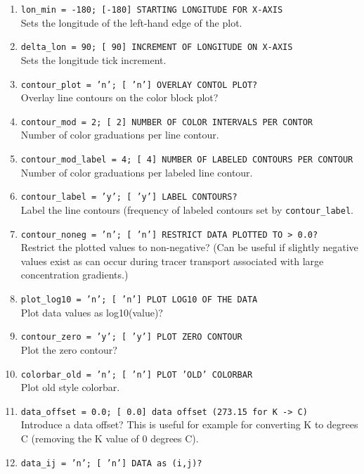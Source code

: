 \documentclass[11pt,fleqn]{book} %
\begin{document}
\vspace{2pt}
{\small \begin{enumerate}
\item \texttt{lon\_min = -180;         [-180]  STARTING LONGITUDE FOR X-AXIS}
\\ Sets the longitude of the left-hand edge of the plot.
\item \texttt{delta\_lon = 90;         [  90]  INCREMENT OF LONGITUDE ON X-AXIS}
\\ Sets the longitude tick increment.
\item \texttt{contour\_plot = 'n';     [ 'n']  OVERLAY CONTOL PLOT?}
\\ Overlay line contours on the color block plot?
\item \texttt{contour\_mod = 2;        [   2]  NUMBER OF COLOR INTERVALS PER CONTOR}
\\ Number of color graduations per line contour.
\item \texttt{contour\_mod\_label = 4;  [   4]  NUMBER OF LABELED CONTOURS PER CONTOUR}
\\ Number of color graduations per labeled line contour.
\item \texttt{contour\_label = 'y';    [ 'y']  LABEL CONTOURS?}
\\ Label the line contours (frequency of labeled contours set by \texttt{contour\_label}.
\item \texttt{contour\_noneg = 'n';    [ 'n']  RESTRICT DATA PLOTTED TO > 0.0?}
\\ Restrict the plotted values to non-negative? (Can be useful if slightly negative values exist as can occur during tracer transport associated with large concentration gradients.)
\item \texttt{plot\_log10 = 'n';       [ 'n']  PLOT LOG10 OF THE DATA}
\\ Plot data values as log10(value)?
\item \texttt{contour\_zero = 'y';     [ 'y']  PLOT ZERO CONTOUR}
\\ Plot the zero contour?
\item \texttt{colorbar\_old = 'n';     [ 'n']  PLOT 'OLD' COLORBAR}
\\ Plot old style colorbar.
\item \texttt{data\_offset = 0.0;      [ 0.0]  data offset (273.15 for K -> C)}
\\ Introduce a data offset? This is useful for example for converting K to degrees C (removing the K value of 0 degrees C).
\item \texttt{data\_ij = 'n';          [ 'n']  DATA as (i,j)?}

\end{enumerate}}
\end{document}
